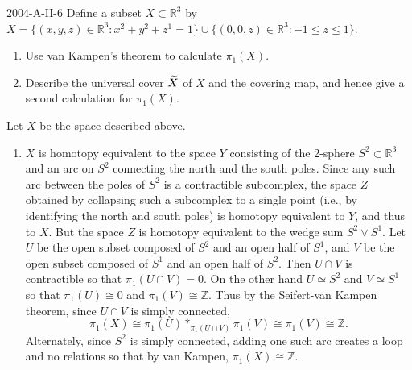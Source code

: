 \documentclass{article}
\begin{document}
	\begin{prb}{2004-A-II-6}
		Define a subset $X \subset \mathbb{R}^{3}$ by $X = \{(x, y, z) \in \mathbb{R}^{3}: x^{2} + y^{2} + z^{1} = 1\} \cup \{(0,0,z) \in \mathbb{R}^{3}: -1 \leq z \leq 1\}$. \vspace{-0.25cm}
		\begin{enumerate}[itemsep =-2pt,label = (\alph{*})]
			\item Use van Kampen's theorem to calculate $\pi_{1}(X)$. 
			\item Describe the universal cover $\widetilde{X}$ of $X$ and the covering map, and hence give a second calculation for $\pi_{1}(X)$. 
		\end{enumerate}
	\end{prb}
	Let $X$ be the space described above. \vspace{-0.25cm}
	\begin{enumerate}[itemsep = -2pt,label = (\alph{*})]
		\item $X$ is homotopy equivalent to the space $Y$ consisting of the 2-sphere $S^{2} \subset \mathbb{R}^{3}$ and an arc on $S^{2}$ connecting the north and the south poles. Since any such arc between the poles of $S^{2}$ is a contractible subcomplex, the space $Z$ obtained by collapsing such a subcomplex to a single point (i.e., by identifying the north and south poles) is homotopy equivalent to $Y$, and thus to $X$. But the space $Z$ is homotopy equivalent to the wedge sum $S^{2}\vee S^{1}$. Let $U$ be the open subset composed of $S^{2}$ and an open half of $S^{1}$, and $V$ be the open subset composed of $S^{1}$ and an open half of $S^{2}$. Then $U \cap V$ is contractible so that $\pi_{1}(U \cap V) = 0$. On the other hand $U \simeq S^{2}$ and $V \simeq S^{1}$ so that $\pi_{1}(U) \cong 0$ and $\pi_{1}(V) \cong \mathbb{Z}$. Thus by the Seifert-van Kampen theorem, since $U \cap V$ is simply connected, 
		\begin{equation*}
			\pi_{1}(X) \cong \pi_{1}(U) \ast_{\pi_{1}(U \cap V)} \pi_{1}(V) \cong \pi_{1}(V) \cong \mathbb{Z}. 
		\end{equation*}
		Alternately, since $S^{2}$ is simply connected, adding one such arc creates a loop and no relations so that by van Kampen, $\pi_{1}(X) \cong \mathbb{Z}$. 

\end{enumerate}
\end{document}
